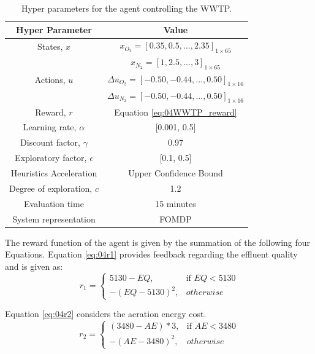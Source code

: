 \begin{table}[H]
\caption{Hyper parameters for the agent controlling the WWTP.}
\label{tab:04WWTPagent}
\centering
\begin{tabular}{c|c}
\textbf{Hyper Parameter}     & \textbf{Value}  \\
\hline
States, $x$	             	& $x_{O_2} = [0.35, 0.5, ..., 2.35]_{1 \times 65} $		 \\
        	             	& $x_{N_2} = [1, 2.5, ..., 3]_{1 \times 65} $		 \\
Actions, $u$                & $\Delta u_{O_2} = [-0.50, -0.44, ..., 0.50]_{1 \times 16}$	         \\
                            & $\Delta u_{N_2} = [-0.50, -0.44, ..., 0.50]_{1 \times 16}$		\\
Reward, $r$	                & Equation \ref{eq:04WWTP_reward}		\\
Learning rate, $\alpha$		& [0.001, 0.5]		 \\
Discount factor, $\gamma$      	& 0.97  \\
Exploratory factor, $\epsilon$             & [0.1, 0.5]  \\
Heuristics Acceleration     & Upper Confidence Bound \\
Degree of exploration, $c$  & 1.2 \\
Evaluation time                 & 15 minutes \\
System representation           & FOMDP \\
\end{tabular}
\end{table}

The reward function of the agent is given by the summation of the following four Equations.  Equation \ref{eq:04r1} provides feedback regarding the effluent quality and is given as:
\begin{equation}
    r_1 =
\begin{cases}
        5130 - EQ,              & \text{if } EQ < 5130 \\
        -(EQ - 5130)^2,              & otherwise 
        \label{eq:04r1}
\end{cases}
\end{equation}

Equation \ref{eq:04r2} considers the aeration energy cost.
\begin{equation}
    r_2 =
\begin{cases}
    (3480 - AE) * 3,              & \text{if } AE  < 3480 \\
    -(AE - 3480)^2,              & otherwise 
    \label{eq:04r2}
\end{cases}
\end{equation}

